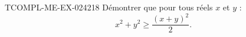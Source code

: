 \begin{exercice}{TCOMPL-ME-EX-024}{2}{18}
Démontrer que pour tous réels $x$ et $y$ :
\[ x^2 + y^2 \geq \frac{(x+y)^2}{2}. \]

\end{exercice}
